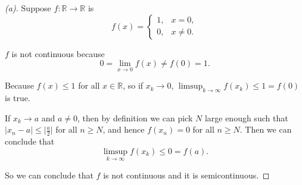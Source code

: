 \begin{proof}[(a)]
    Suppose $f : \mathbb{R} \to \mathbb{R}$ is
    \[
    f(x)=
    \begin{cases}
    1,& x=0,\\
    0,& x\neq 0.
    \end{cases}
    \]
    \begin{center}
    \end{center}

    $f$ is not continuous because
    \[
        0 =\lim_{x \to 0} f(x) \neq f(0) = 1.
    \]

    Because $f(x) \le 1 $ for all $x \in \mathbb{R}$, so if $x_k \to 0$, $\limsup_{k\to\infty} f(x_k)\le 1 = f(0)$ is true. 
    
    If $x_k \to a$ and $a \ne 0$, then by definition we can pick $N$ large enough such that $\vert x_n - a \vert \le \lvert \frac{a}{2} \rvert$ for all $n  \ge N$, and hence $f(x_n) = 0$ for all $n \ge N$. Then we can conclude that 
    \[
    \limsup_{k\to\infty} f(x_k)\le 0 = f(a).
    \]

    So we can conclude that $f$ is not continuous and it is semicontinuous.
\end{proof}

